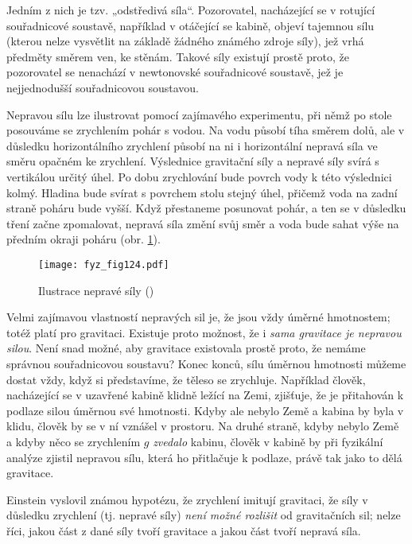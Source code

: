     Jedním z nich je tzv. „odstředivá síla“. Pozorovatel, nacházející se v rotující souřadnicové 
    soustavě, například v otáčející se kabině, objeví tajemnou sílu (kterou nelze vysvětlit na 
    základě žádného známého zdroje síly), jež vrhá předměty směrem ven, ke stěnám. Takové síly 
    existují prostě proto, že pozorovatel se nenachází v newtonovské souřadnicové soustavě, jež je 
    nejjednodušší souřadnicovou soustavou.
    
    Nepravou sílu lze ilustrovat pomocí zajímavého experimentu, při němž po stole posouváme se 
    zrychlením pohár s vodou. Na vodu působí tíha směrem dolů, ale v důsledku horizontálního 
    zrychlení působí na ni i horizontální nepravá síla ve směru opačném ke zrychlení. Výslednice 
    gravitační síly a nepravé síly svírá s vertikálou určitý úhel. Po dobu zrychlování bude povrch 
    vody k této výslednici kolmý. Hladina bude svírat s povrchem stolu stejný úhel, přičemž voda na 
    zadní straně poháru bude vyšší. Když přestaneme posunovat pohár, a ten se v důsledku tření 
    začne zpomalovat, nepravá síla změní svůj směr a voda bude sahat výše na předním okraji poháru 
    (obr. \ref{fyz:fig124}).
    
    \begin{figure}[ht!]  %
      \centering
      \texttt{[image: fyz\_fig124.pdf]}
      \caption{Ilustrace nepravé síly
              (\cite[s.~181]{Feynman01})}
      \label{fyz:fig124}
    \end{figure}
    Velmi zajímavou vlastností nepravých sil je, že jsou vždy úměrné hmotnostem; totéž platí pro 
    gravitaci. Existuje proto možnost, že i \emph{sama gravitace je nepravou silou}. Není snad 
    možné, aby gravitace existovala prostě proto, že nemáme správnou souřadnicovou soustavu? Konec 
    konců, sílu úměrnou hmotnosti můžeme dostat vždy, když si představíme, že těleso se zrychluje. 
    Například člověk, nacházející se v uzavřené kabině klidně ležící na Zemi, zjišťuje, že je 
    přitahován k podlaze silou úměrnou své hmotnosti. Kdyby ale nebylo Země a kabina by byla v 
    klidu, člověk by se v ní vznášel v prostoru. Na druhé straně, kdyby nebylo Země a kdyby něco se 
    zrychlením \(g\) \emph{zvedalo} kabinu, člověk v kabině by při fyzikální analýze zjistil 
    nepravou sílu, která ho přitlačuje k podlaze, právě tak jako to dělá gravitace.
    
    Einstein vyslovil známou hypotézu, že zrychlení imitují gravitaci, že síly v důsledku zrychlení 
    (tj. nepravé síly) \emph{není možné rozlišit} od gravitačních sil; nelze říci, jakou část z 
    dané síly tvoří gravitace a jakou část tvoří nepravá síla.
    

